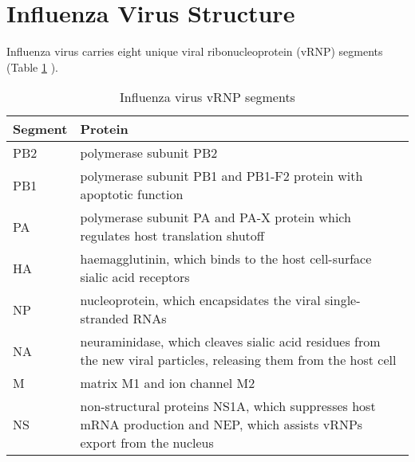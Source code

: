 \section{Influenza Virus Structure}

Influenza virus carries eight unique viral ribonucleoprotein  (vRNP) segments (Table \ref{table:fluSegments} \cite{das2010structures}).

\begin{table}[h!]
\centering
\caption{Influenza virus vRNP segments}
\label{table:fluSegments}

\begin{tabular}{|p{2cm}|p{10cm}|}
\hline 
Segment&    Protein\\
\hline
PB2&    polymerase subunit PB2\\
PB1&    polymerase subunit PB1 and PB1-F2 protein with  apoptotic function\\
PA&     polymerase subunit PA and PA-X protein which regulates host translation shutoff \cite{khaperskyy2016selective}\\
HA&     haemagglutinin, which binds to the host cell-surface sialic acid receptors\\
NP&     nucleoprotein, which encapsidates the viral single-stranded RNAs\\
NA&     neuraminidase, which cleaves sialic acid residues from the new viral particles, releasing them from the host cell\\
M&      matrix M1 and ion channel M2\\
NS&     non-structural proteins NS1A, which suppresses host mRNA production and NEP, which assists vRNPs export from the nucleus\\
\hline
\end{tabular}
\end{table}